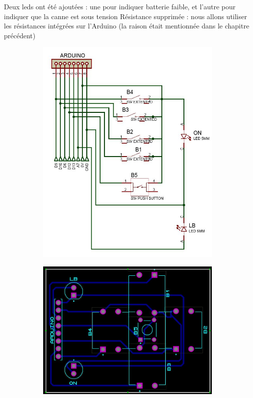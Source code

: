 \FloatBarrier

Deux leds ont été ajoutées : une pour indiquer batterie faible, et l’autre pour indiquer que la canne est sous tension 
Résistance supprimée : nous allons utiliser les résistances intégrées sur l’Arduino (la raison était mentionnée dans le chapitre précédent)

\begin{figure}[!htbp]
    \centering
    \begin{subfigure}[m]{.48\linewidth}
        \centering
        \includegraphics[width=\textwidth]{assets/conception1/img78.jpg}
    \end{subfigure}
    \hfill
    \begin{subfigure}[m]{.48\linewidth}
        \centering
        \includegraphics[width=\textwidth]{assets/conception1/img79.jpg}

\end{subfigure}
\end{figure}
